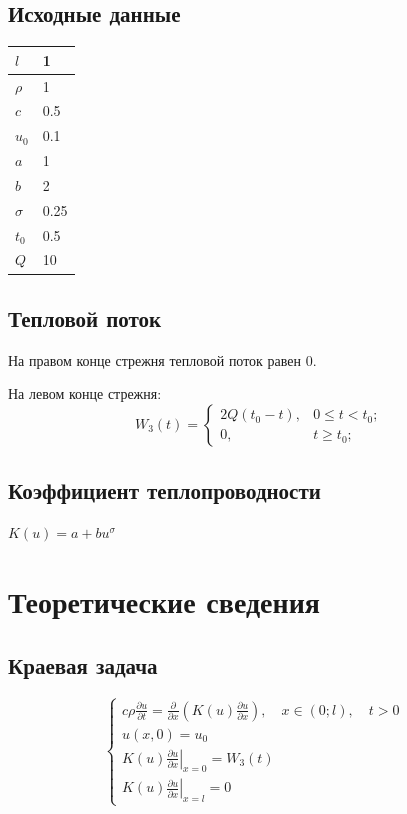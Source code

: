 \documentclass[a4paper,12pt]{article}
\begin{document}
\subsection{Исходные данные}

    \begin{tabular}{|C|M|}
        \hline
         \(l\) & 1 \\ \hline
         \(\rho\) & 1 \\ \hline
         \(c\) & 0.5 \\ \hline
         \(u_0\) & 0.1 \\ \hline
         \(a\) & 1 \\ \hline
         \(b\) & 2 \\ \hline
         \(\sigma\) & 0.25 \\ \hline
         \(t_0\) & 0.5 \\ \hline
         \(Q\) & 10 \\ \hline
    \end{tabular}

\subsection{Тепловой поток}
На правом конце стрежня тепловой поток равен 0.


На левом конце стрежня:
$$W_3(t)=\left\{\begin{array}{lll} 2Q(t_0-t),&0\le t < t_0; \\ 0,&t\ge t_0; \end{array}\right.$$

\subsection{Коэффициент теплопроводности}
 \(K(u) = a + bu^\sigma\)

\newpage
\section{Теоретические сведения}
\subsection{Краевая задача}

\begin{displaymath}
\left \{ 
\begin{array}{ll}
c\rho \frac{\partial u}{\partial t} = \frac{\partial }{\partial x}\left(K(u)\frac{\partial u}{\partial x}\right),\quad x \in (0;l), \quad t > 0
 & \\
u(x,0) = u_0 & \\
\left.K(u)\frac{\partial u}{\partial x}\right |_{x=0} = W_3(t) \\
\left.K(u)\frac{\partial u}{\partial x}\right |_{x=l} = 0
\end{array} 
\right.
\end{displaymath}
\end{document}
